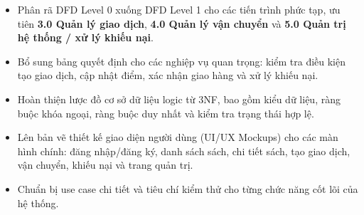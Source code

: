 \documentclass{article}
\begin{document}
\begin{itemize}
    \item Phân rã DFD Level 0 xuống DFD Level 1 cho các tiến trình phức tạp, ưu tiên \textbf{3.0 Quản lý giao dịch}, \textbf{4.0 Quản lý vận chuyển} và \textbf{5.0 Quản trị hệ thống / xử lý khiếu nại}.
    \item Bổ sung bảng quyết định cho các nghiệp vụ quan trọng: kiểm tra điều kiện tạo giao dịch, cập nhật điểm, xác nhận giao hàng và xử lý khiếu nại.
    \item Hoàn thiện lược đồ cơ sở dữ liệu logic từ 3NF, bao gồm kiểu dữ liệu, ràng buộc khóa ngoại, ràng buộc duy nhất và kiểm tra trạng thái hợp lệ.
    \item Lên bản vẽ thiết kế giao diện người dùng (UI/UX Mockups) cho các màn hình chính: đăng nhập/đăng ký, danh sách sách, chi tiết sách, tạo giao dịch, vận chuyển, khiếu nại và trang quản trị.
    \item Chuẩn bị use case chi tiết và tiêu chí kiểm thử cho từng chức năng cốt lõi của hệ thống.
\end{itemize}
\end{document}
